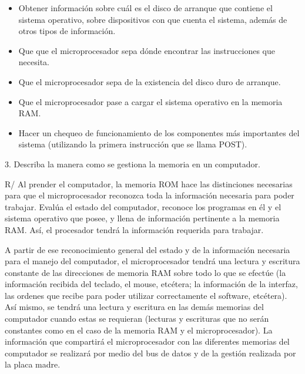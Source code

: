 \documentclass{article}
\begin{document}
\begin{itemize}
\begin{itemize}
        \item 
            Obtener información sobre cuál es el disco de arranque que contiene el sistema operativo, sobre dispositivos con que cuenta el sistema, además de otros tipos de información.
            
        \item
            Que que el microprocesador sepa dónde encontrar las instrucciones que necesita.
            
        \item
            Que el microprocesador sepa de la existencia del disco duro de arranque.
            
        \item
            Que el microprocesador pase a cargar el sistema operativo en la memoria RAM.
            
        \item
            Hacer un chequeo de funcionamiento de los componentes más importantes del sistema (utilizando la primera instrucción que se llama POST).
            
        \end{itemize}

\end{itemize}

\vspace{1.0cm}
3. Describa la manera como se gestiona la memoria en un computador.

\vspace{0.3cm}
R/ Al prender el computador, la memoria ROM hace las distinciones necesarias para que el microprocesador reconozca toda la información necesaria para poder trabajar. Evalúa el estado del computador, reconoce los programas en él y el sistema operativo que posee, y llena de información pertinente a la memoria RAM. Así, el procesador tendrá la información requerida para trabajar.

A partir de ese reconocimiento general del estado y de la información necesaria para el manejo del computador, el microprocesador tendrá una lectura y escritura constante de las direcciones de memoria RAM sobre todo lo que se efectúe (la información recibida del teclado, el mouse, etcétera; la información de la interfaz, las ordenes que recibe para poder utilizar correctamente el software, etcétera). Así mismo, se tendrá una lectura y escritura en las demás memorias del computador cuando estas se requieran (lecturas y escrituras que no serán constantes como en el caso de la memoria RAM y el microprocesador). La información que compartirá el microprocesador con las diferentes memorias del computador se realizará por medio del bus de datos y de la gestión realizada por la placa madre.
\end{document}

